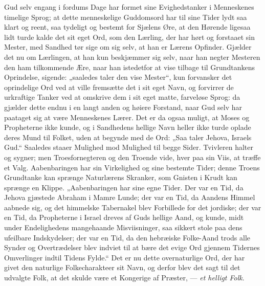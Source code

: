 \documentclass[12pt,a4paper]{book}
\begin{document}
Gud selv engang i fordums Dage har formet sine Evighedstanker i Menneskenes
timelige Sprog; at dette menneskelige Guddomsord har til sine Tider lydt saa
klart og reent, saa tydeligt og bestemt for Sjælens Øre, at den Hørende ligesaa
lidt turde kalde det sit eget Ord, som den Lærling, der har hørt og forstaaet
sin Mester, med Sandhed tør sige om sig selv, at han er Lærens Opfinder.
Gjælder det nu om Lærlingen, at han kun beskjæmmer sig selv, naar han negter
Mesteren den ham tilkommende Ære, naar han istedetfor at vise
tilbage til Grundtankens Oprindelse, sigende: „saaledes taler den vise Mester“,
kun forvansker det oprindelige Ord ved at ville fremsætte det i sit eget Navn,
og forvirrer de urkraftige Tanker ved at omskrive dem i sit eget matte,
farveløse Sprog: da gjælder dette endnu i en langt anden og høiere Forstand,
naar Gud selv har paataget sig at være Menneskenes Lærer. Det er da ogsaa
muligt, at Moses og Propheterne ikke kunde, og i Sandhedens hellige Navn heller
ikke turde oplade deres Mund til Folket, uden at begynde med de Ord: „Saa taler
Jehova, Israels Gud.“ Saaledes staaer Mulighed mod Mulighed til begge Sider.
Tvivleren halter og sygner; men Troesfornegteren og den Troende vide, hver paa
sin Viis, at træffe et Valg. Aabenbaringen har sin Virkelighed og sine bestemte
Tider; denne Troens Grundtanke kan sprænge Naturlærens Skranker, som Gnisten i
Krudt kan sprænge en Klippe. „Aabenbaringen har sine egne Tider. Der var en Tid,
da Jehova gjæstede Abraham i Mamre Lunde; der var en Tid, da Aandens Himmel
aabnede sig, og det himmelske Tabernakel blev Forbillede for det jordiske; der
var en Tid, da Propheterne i Israel dreves af Guds hellige Aand, og kunde, midt
under Endelighedens mangehaande Misviisninger, saa sikkert stole paa dens
ufeilbare Indskydelser; der var en Tid, da den hebræiske Folke-Aand trods alle
Synder og Overtrædelser blev indviet til at bære det evige Ord gjennem Tidernes
Omverlinger indtil Tidens Fylde.“ Det er nu dette overnaturlige Ord, der har
givet den naturlige Folkecharakteer sit Navn, og derfor blev det sagt til det
udvalgte Folk, at det skulde være et Kongerige af Præster, --- \emph{et helligt
Folk}.
\end{document}

